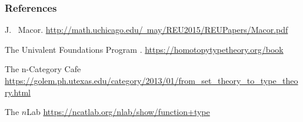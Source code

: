 \documentclass[10pt]{beamer}
\begin{document}
\begin{frame}
\frametitle{References}
\begin{thebibliography}{}
J. ~Macor.
\newblock \href{http://math.uchicago.edu/~may/REU2015/REUPapers/Macor.pdf}{\footnotesize http://math.uchicago.edu/~may/REU2015/REUPapers/Macor.pdf}


The {Univalent Foundations Program}
.
\newblock \href{https://homotopytypetheory.org/book}{\footnotesize https://homotopytypetheory.org/book}

    The n-Category Caf$\acute{\text{e}}$
\newblock \href{https://golem.ph.utexas.edu/category/2013/01/from_set_theory_to_type_theory.html}{\footnotesize https://golem.ph.utexas.edu/category/2013/01/from\_set\_theory\_to\_type\_theory.html}

The $n$Lab
\newblock \href{https://ncatlab.org/nlab/show/function+type}{\footnotesize https://ncatlab.org/nlab/show/function+type}

\end{thebibliography}
\end{frame}
\end{document}
